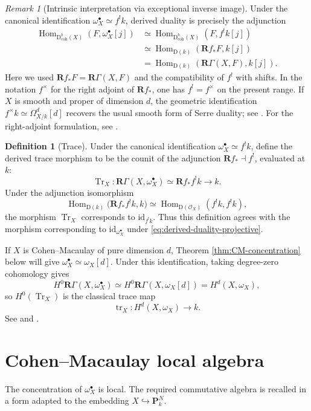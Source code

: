 \documentclass[11pt,a4paper]{article}
\theoremstyle{definition}
\newtheorem{definition}[theorem]{Definition}
\theoremstyle{remark}
\newtheorem{remark}[theorem]{Remark}
\newcommand{\OO}{\mathcal O}
\newcommand{\PP}{\mathbf P}
\newcommand{\Hom}{\operatorname{Hom}}
\newcommand{\RGamma}{\mathbf R\Gamma}
\newcommand{\D}{\mathrm D}
\newcommand{\Dbcoh}{\mathrm D^b_{\mathrm{coh}}}
\newcommand{\tr}{\operatorname{tr}}
\begin{document}
\begin{remark}[Intrinsic interpretation via exceptional inverse image]
Under the canonical identification $\omega_X^\bullet\simeq f^!k$, derived
duality is precisely the adjunction
\begin{align*}
  \Hom_{\Dbcoh(X)}(F,\omega_X^\bullet[j])
  &\simeq
    \Hom_{\Dbcoh(X)}(F,f^!k[j])\\
  &\simeq
    \Hom_{\D(k)}(\mathbf Rf_*F,k[j])\\
  &=
    \Hom_{\D(k)}(\RGamma(X,F),k[j]).
\end{align*}
Here we used $\mathbf Rf_*F=\RGamma(X,F)$ and the compatibility of $f^!$
with shifts. In the notation $f^\times$ for the right adjoint of
$\mathbf Rf_*$, one has $f^!=f^\times$ on the present range.
If $X$ is smooth and proper of dimension $d$, the geometric identification
$f^\times k\simeq\Omega^d_{X/k}[d]$ recovers the usual smooth form of Serre
duality; see \cite[Tag 0FVV]{Stacks}. For the right-adjoint formulation, see
\cite[Section 3.3]{NeemanSimple}.
\end{remark}

\begin{definition}[Trace]
\label{def:trace}
Under the canonical identification $\omega_X^\bullet\simeq f^!k$, define the
derived trace morphism to be the counit of the adjunction
$\mathbf Rf_*\dashv f^!$, evaluated at $k$:
\[
  \operatorname{Tr}_X:
  \RGamma(X,\omega_X^\bullet)
  \simeq \mathbf Rf_*f^!k
  \longrightarrow k.
\]
Under the adjunction isomorphism
\[
  \Hom_{\D(k)}\bigl(\mathbf Rf_*f^!k,k\bigr)
  \simeq
  \Hom_{\D(\OO_X)}(f^!k,f^!k),
\]
the morphism $\operatorname{Tr}_X$ corresponds to
$\mathrm{id}_{f^!k}$. Thus this definition agrees with the morphism
corresponding to $\mathrm{id}_{\omega_X^\bullet}$ under
\eqref{eq:derived-duality-projective}.

If $X$ is Cohen--Macaulay of pure dimension $d$, Theorem
\ref{thm:CM-concentration} below will give
$\omega_X^\bullet\simeq\omega_X[d]$. Under this identification, taking
degree-zero cohomology gives
\[
  H^0\RGamma(X,\omega_X^\bullet)
  \simeq H^0\RGamma(X,\omega_X[d])
  =H^d(X,\omega_X),
\]
so $H^0(\operatorname{Tr}_X)$ is the classical trace map
\[
  \tr_X:H^d(X,\omega_X)\longrightarrow k.
\]
See
\cite[Tag 0A9D]{Stacks} and
\cite[Section 3.3]{NeemanSimple}.
\end{definition}

\section{Cohen--Macaulay local algebra}

The concentration of $\omega_X^\bullet$ is local.  The required commutative
algebra is recalled in a form adapted to the embedding
$X\hookrightarrow\PP^N_k$.
\end{document}
